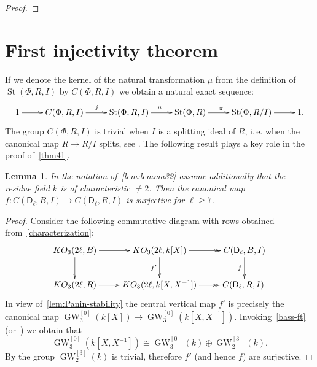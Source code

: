 \documentclass[oneside, 8pt]{amsart}
\newtheorem{lemma}{Lemma}
\theoremstyle{remark}
\theoremstyle{definition}
\DeclareMathOperator{\St}{St}
\DeclareMathOperator{\GW}{GW}
\newcommand{\rD}{\mathsf{D}}
\numberwithin{equation}{section}
\begin{document}
\begin{proof}
\begin{comment}
\begin{multline} 
 [x_\alpha(m), x_{-\alpha}(X\xi)] = [x_\alpha(m), [x_{-\alpha-\beta}(N_{-\alpha-\beta, \beta} X), x_{\beta}(\xi)]] = \\ = \left([[ x_\alpha(m), x_{-\alpha-\beta}(-N_{-\alpha-\beta, \beta}X)], x_{\beta}(\xi)] ^ {x_\alpha(-m)} \cdot  [[ x_{\beta}(-\xi), x_\alpha(m)], x_{-\alpha-\beta}(-N_{-\alpha-\beta, \beta}X)] ^ {x_{\beta}(-\xi)}\right)^{x_{-\alpha-\beta}(-N_{-\alpha-\beta, \beta}X)} = \\ = \left([x_{-\beta}(-N_{-\alpha-\beta,\beta}N_{\alpha,-\alpha-\beta}mX), x_{\beta}(\xi)] ^ {x_\alpha(-m)} \cdot  [ x_{\alpha + \beta}(-N_{\beta, \alpha}m\xi), x_{-\alpha-\beta}(-N_{-\alpha-\beta, \beta}X)] ^ {x_{\beta}(-\xi)}\right)^{x_{-\alpha-\beta}(-N_{-\alpha-\beta, \beta}X)} =
\end{multline}
\end{comment}
\end{proof}

\section{First injectivity theorem}
If we denote the kernel of the natural transformation $\mu$ from the definition of $\St(\Phi, R, I)$ by $C(\Phi, R, I)$ we obtain a natural exact sequence:
\begin{equation} \label{relSteinberg-def}
 \xymatrix{ 1 \ar[r] & C(\Phi, R, I) \ar[r]^{j} & \St(\Phi, R, I) \ar[r]^{\mu} & \St(\Phi, R) \ar[r]^{\pi} & \St(\Phi, R/I) \ar[r] & 1.}
\end{equation}
The group $C(\Phi, R, I)$ is trivial when $I$ is a splitting ideal of $R$, i.\,e. when the canonical map $R \to R/I$ splits, see \cite[Lemma~8]{S15}.
The following result plays a key role in the proof of~\cref{thm41}.
\begin{lemma} \label{lem:prop41}
In the notation of~\cref{lem:lemma32} assume additionally that the residue field $k$ is of characteristic $\neq 2$.
Then the canonical map $f\colon C(\rD_\ell, B, I) \to C(\rD_\ell, R, I)$ is surjective for $\ell \geq 7$.
\end{lemma}
\begin{proof}
  Consider the following commutative diagram with rows obtained from~\cref{characterization}:
\begin{equation*}\xymatrix{
 KO_3(2\ell, B) \ar[r] \ar[d] & KO_3(2\ell, k[X]) \ar[d]_{f'} \ar@{->>}[r] & \ar[d]_{f} C(\rD_\ell, B, I) \\
 KO_3(2\ell, R) \ar[r]        & KO_3(2\ell, k[X, X^{-1}]) \ar@{->>}[r]        & C(\rD_\ell, R, I).}\end{equation*}
In view of~\cref{lem:Panin-stability} the central vertical map $f'$ is precisely the canonical map $\GW_3^{[0]}(k[X]) \to \GW_3^{[0]}(k[X, X^{-1}])$.
Invoking~\cref{bass-ft} (or~\cite[Corollary~5.3]{Ho05}) we obtain that \[\GW_3^{[0]}(k[X, X^{-1}]) \cong \GW_3^{[0]}(k) \oplus \GW_2^{[3]}(k).\]
By \cite[Lemma~2.2]{FRS12} the group $\GW_2^{[3]}(k)$ is trivial, therefore $f'$ (and hence $f$) are surjective.
\end{proof}
\end{document}
